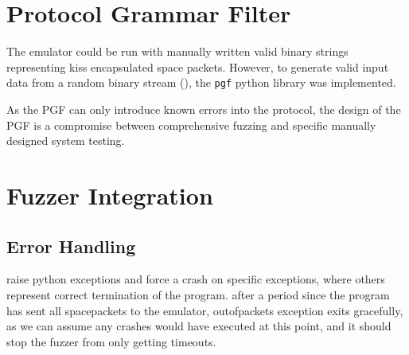 \documentclass[../report.tex]{subfiles}
\begin{document}
\section{Protocol Grammar Filter}

The emulator could be run with manually written valid binary strings
representing kiss encapsulated space packets. However, to generate valid input
data from a random binary stream (), the \lstinline|pgf| python
library was implemented.



As the PGF can only introduce known errors into the protocol, the design of the
PGF is a compromise between comprehensive fuzzing and specific manually
designed system testing.

\section{Fuzzer Integration}

\subsection{Error Handling}

raise python exceptions and force a crash on specific exceptions, where others
represent correct termination of the program. after a period since the program
has sent all spacepackets to the emulator, outofpackets exception exits
gracefully, as we can assume any crashes would have executed at this point, and
it should stop the fuzzer from only getting timeouts.





%
%
%
%
%
%
\end{document}
